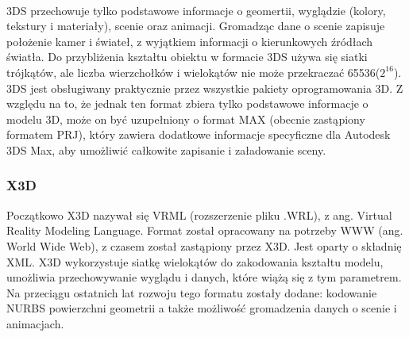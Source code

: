 \paragraph{}
3DS przechowuje tylko podstawowe informacje o geomertii, wyglądzie (kolory, tekstury i materiały), scenie oraz animacji. Gromadząc dane o scenie zapisuje położenie kamer i świateł, z wyjątkiem informacji o kierunkowych źródłach światła. Do przybliżenia kształtu obiektu w formacie 3DS używa się siatki trójkątów, ale liczba wierzchołków i wielokątów nie może przekraczać 65536($2^{16}$). 3DS jest obsługiwany praktycznie przez wszystkie pakiety oprogramowania 3D. Z względu na to, że jednak ten format zbiera tylko podstawowe informacje o modelu 3D, może on być uzupełniony o format MAX (obecnie zastąpiony formatem PRJ), który zawiera dodatkowe informacje specyficzne dla Autodesk 3DS Max, aby umożliwić całkowite zapisanie i załadowanie sceny.

\subsubsection{X3D}
Początkowo X3D nazywał się VRML (rozszerzenie pliku .WRL), z ang. Virtual Reality Modeling Language. Format został opracowany na potrzeby WWW (ang. World Wide Web), z czasem został zastąpiony przez X3D. Jest oparty o składnię XML. X3D wykorzystuje siatkę wielokątów do zakodowania kształtu modelu, umożliwia przechowywanie wyglądu i danych, które wiążą się z tym parametrem. Na przeciągu ostatnich lat rozwoju tego formatu zostały dodane: kodowanie NURBS powierzchni geometrii a także możliwość gromadzenia danych o scenie i animacjach.

